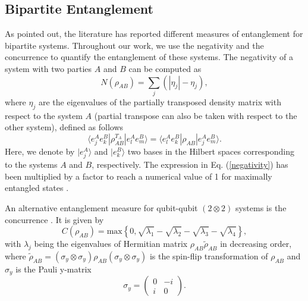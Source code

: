 \subsection{\label{sec:formalism1a}Bipartite Entanglement}
As pointed out, the literature has reported different measures of entanglement for bipartite systems. Throughout our work, we use the negativity and the concurrence to quantify the entanglement of these systems. The negativity \cite{peres1996separability, vidal2002computable} of a system with two parties $A$ and $B$ can be computed as
\begin{equation}\label{negativity}
N\left(\rho_{AB}\right)=\sum_{j}\left(|\eta_{j}|-\eta_{j}\right),
\end{equation}
where $\eta_{j}$ are the eigenvalues of the partially transposed density matrix with respect to the system $A$ (partial transpose can also be taken with respect to the other system), defined as follows
\begin{equation}
\langle e_{j}^{A} e_{k}^{B}|\rho_{AB}^{T_{A}}|e_{l}^{A} e_{m}^{B}\rangle=\langle e_{l}^{A} e_{k}^{B}|\rho_{AB}|e_{j}^{A} e_{m}^{B}\rangle.
\end{equation}
Here, we denote by $|e_{j}^{A}\rangle$ and $|e_{k}^{B}\rangle$ two bases in the Hilbert spaces corresponding to the systems $A$ and $B$, respectively. The expression in Eq. (\ref{negativity}) has been multiplied by a factor to reach a numerical value of 1 for maximally entangled states \cite{leggio2020bounds}.

An alternative entanglement measure for qubit-qubit $(2\otimes2)$ systems is the concurrence \cite{wootters2001entanglement}. It is given by
\begin{equation}\label{concurrence}
C\left(\rho_{AB}\right)=\textrm{max}\left\{0, \sqrt{\lambda_{1}}-\sqrt{\lambda_{2}}-\sqrt{\lambda_{3}}-\sqrt{\lambda_{4}}\right\},
\end{equation}
with $\lambda_{j}$ being the eigenvalues of Hermitian matrix $\rho_{AB} \tilde\rho_{AB}$ in decreasing order, where $\tilde\rho_{AB}=\left(\sigma_{y}\otimes\sigma_{y}\right)\rho_{AB}\left(\sigma_{y}\otimes\sigma_{y}\right)$ is the spin-flip transformation of $\rho_{AB}$ and $\sigma_{y}$ is the Pauli y-matrix 
\begin{equation}
\sigma_{y}=
 \begin{pmatrix}
 0 & -i \\
 i & 0
 \end{pmatrix}.
\end{equation}

